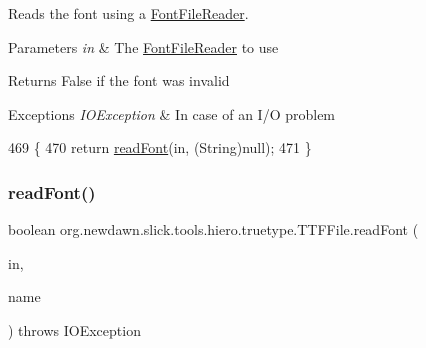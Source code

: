 Reads the font using a \mbox{\hyperlink{classorg_1_1newdawn_1_1slick_1_1tools_1_1hiero_1_1truetype_1_1_font_file_reader}{Font\+File\+Reader}}.


\begin{DoxyParams}{Parameters}
{\em in} & The \mbox{\hyperlink{classorg_1_1newdawn_1_1slick_1_1tools_1_1hiero_1_1truetype_1_1_font_file_reader}{Font\+File\+Reader}} to use \\
\hline
\end{DoxyParams}
\begin{DoxyReturn}{Returns}
False if the font was invalid 
\end{DoxyReturn}

\begin{DoxyExceptions}{Exceptions}
{\em I\+O\+Exception} & In case of an I/O problem \\
\hline
\end{DoxyExceptions}

\begin{DoxyCode}
469                                                                   \{
470         \textcolor{keywordflow}{return} \mbox{\hyperlink{classorg_1_1newdawn_1_1slick_1_1tools_1_1hiero_1_1truetype_1_1_t_t_f_file_a8130f3772fac304168fdf64d6f26dfbe}{readFont}}(in, (String)null);
471     \}
\end{DoxyCode}
\mbox{\label{classorg_1_1newdawn_1_1slick_1_1tools_1_1hiero_1_1truetype_1_1_t_t_f_file_a456dfa68ed9b779aa147e1ead99bb8b9}} 
\subsubsection{\texorpdfstring{read\+Font()}{readFont()}\hspace{0.1cm}{\footnotesize\ttfamily [2/2]}}
{\footnotesize\ttfamily boolean org.\+newdawn.\+slick.\+tools.\+hiero.\+truetype.\+T\+T\+F\+File.\+read\+Font (\begin{DoxyParamCaption}\item[{\mbox{\hyperlink{classorg_1_1newdawn_1_1slick_1_1tools_1_1hiero_1_1truetype_1_1_font_file_reader}{Font\+File\+Reader}}}]{in,  }\item[{String}]{name }\end{DoxyParamCaption}) throws I\+O\+Exception\hspace{0.3cm}{\ttfamily [inline]}}


